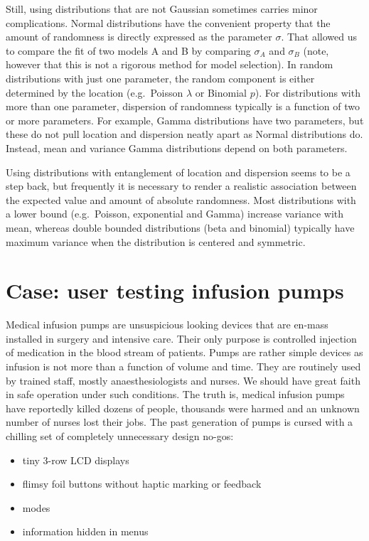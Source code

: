 \documentclass[]{svmono}
\providecommand{\tightlist}{%
  \setlength{\itemsep}{0pt}\setlength{\parskip}{0pt}}
\begin{document}
Still, using distributions that are not Gaussian sometimes carries minor
complications. Normal distributions have the convenient property that
the amount of randomness is directly expressed as the parameter
\(\sigma\). That allowed us to compare the fit of two models A and B by
comparing \(\sigma_A\) and \(\sigma_B\) (note, however that this is not
a rigorous method for model selection). In random distributions with
just one parameter, the random component is either determined by the
location (e.g.~Poisson \(\lambda\) or Binomial \(p\)). For distributions
with more than one parameter, dispersion of randomness typically is a
function of two or more parameters. For example, Gamma distributions
have two parameters, but these do not pull location and dispersion
neatly apart as Normal distributions do. Instead, mean and variance
Gamma distributions depend on both parameters.

Using distributions with entanglement of location and dispersion seems
to be a step back, but frequently it is necessary to render a realistic
association between the expected value and amount of absolute
randomness. Most distributions with a lower bound (e.g.~Poisson,
exponential and Gamma) increase variance with mean, whereas double
bounded distributions (beta and binomial) typically have maximum
variance when the distribution is centered and symmetric.

\section{Case: user testing infusion
pumps}\label{case-user-testing-infusion-pumps}

Medical infusion pumps are unsuspicious looking devices that are en-mass
installed in surgery and intensive care. Their only purpose is
controlled injection of medication in the blood stream of patients.
Pumps are rather simple devices as infusion is not more than a function
of volume and time. They are routinely used by trained staff, mostly
anaesthesiologists and nurses. We should have great faith in safe
operation under such conditions. The truth is, medical infusion pumps
have reportedly killed dozens of people, thousands were harmed and an
unknown number of nurses lost their jobs. The past generation of pumps
is cursed with a chilling set of completely unnecessary design no-gos:

\begin{itemize}
\tightlist
\item
  tiny 3-row LCD displays
\item
  flimsy foil buttons without haptic marking or feedback
\item
  modes
\item
  information hidden in menus
\end{itemize}
\end{document}

